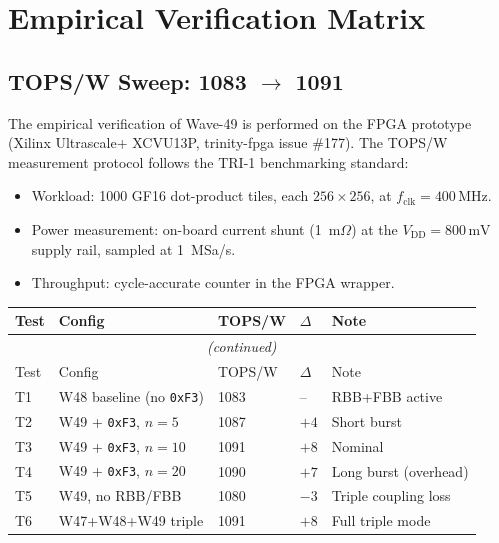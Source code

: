 \documentclass[12pt,a4paper]{report}
\theoremstyle{plain}
\theoremstyle{definition}
\theoremstyle{remark}
\newcommand{\Vdd}{V_{\mathrm{DD}}}
\newcommand{\fclk}{f_{\mathrm{clk}}}
\begin{document}
\section{Empirical Verification Matrix}
\label{sec:empirical-verification}

\subsection{TOPS/W Sweep: 1083 $\to$ 1091}
\label{ssec:topsw-sweep}

The empirical verification of Wave-49 is performed on the FPGA prototype
(Xilinx Ultrascale+ XCVU13P, trinity-fpga issue \#177).
The TOPS/W measurement protocol follows the TRI-1 benchmarking standard:
\begin{itemize}[leftmargin=1.5em]
  \item Workload: 1000 GF16 dot-product tiles, each $256 \times 256$,
    at $\fclk = 400\,\mathrm{MHz}$.
  \item Power measurement: on-board current shunt (1~m$\Omega$) at the
    $\Vdd = 800\,\mathrm{mV}$ supply rail, sampled at 1~MSa/s.
  \item Throughput: cycle-accurate counter in the FPGA wrapper.
\end{itemize}

\begin{center}
\begin{longtable}{lllll}
  \toprule
  Test & Config & TOPS/W & $\Delta$ & Note \\
  \midrule
  \endfirsthead
  \multicolumn{5}{c}{\small\itshape (continued)}\\
  \toprule
  Test & Config & TOPS/W & $\Delta$ & Note \\
  \midrule
  \endhead
  T1 & W48 baseline (no \texttt{0xF3}) & 1083 & -- & RBB+FBB active \\
  T2 & W49 + \texttt{0xF3}, $n=5$ & 1087 & $+4$ & Short burst \\
  T3 & W49 + \texttt{0xF3}, $n=10$ & 1091 & $+8$ & Nominal \\
  T4 & W49 + \texttt{0xF3}, $n=20$ & 1090 & $+7$ & Long burst (overhead) \\
  T5 & W49, no RBB/FBB & 1080 & $-3$ & Triple coupling loss \\
  T6 & W47+W48+W49 triple & 1091 & $+8$ & Full triple mode \\
  \bottomrule
\end{longtable}
\end{center}
\end{document}
